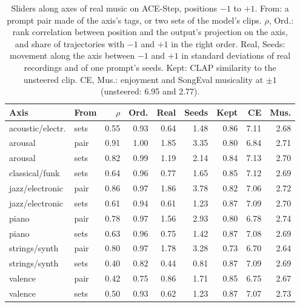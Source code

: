 \begin{table}[t]\centering\footnotesize\setlength{\tabcolsep}{2.5pt}
\begin{tabular}{llrrrrrrr}
\toprule
Axis & From & $\rho$ & Ord. & Real & Seeds & Kept & CE & Mus. \\
\midrule
acoustic/electr. & sets & 0.55 & 0.93 & 0.64 & 1.48 & 0.86 & 7.11 & 2.68 \\
arousal & pair & 0.91 & 1.00 & 1.85 & 3.35 & 0.80 & 6.84 & 2.71 \\
arousal & sets & 0.82 & 0.99 & 1.19 & 2.14 & 0.84 & 7.13 & 2.70 \\
classical/funk & sets & 0.64 & 0.96 & 0.77 & 1.65 & 0.85 & 7.12 & 2.69 \\
jazz/electronic & pair & 0.86 & 0.97 & 1.86 & 3.78 & 0.82 & 7.06 & 2.72 \\
jazz/electronic & sets & 0.61 & 0.94 & 0.61 & 1.23 & 0.87 & 7.09 & 2.70 \\
piano & pair & 0.78 & 0.97 & 1.56 & 2.93 & 0.80 & 6.78 & 2.74 \\
piano & sets & 0.63 & 0.96 & 0.75 & 1.42 & 0.87 & 7.08 & 2.69 \\
strings/synth & pair & 0.80 & 0.97 & 1.78 & 3.28 & 0.73 & 6.70 & 2.64 \\
strings/synth & sets & 0.40 & 0.82 & 0.44 & 0.81 & 0.87 & 7.09 & 2.69 \\
valence & pair & 0.42 & 0.75 & 0.86 & 1.71 & 0.85 & 6.75 & 2.67 \\
valence & sets & 0.50 & 0.93 & 0.62 & 1.23 & 0.87 & 7.07 & 2.73 \\
\bottomrule
\end{tabular}
\caption{Sliders along axes of real music on ACE-Step, positions $-1$ to $+1$. From: a prompt pair made of the axis's tags, or two sets of the model's clips. $\rho$, Ord.: rank correlation between position and the output's projection on the axis, and share of trajectories with $-1$ and $+1$ in the right order. Real, Seeds: movement along the axis between $-1$ and $+1$ in standard deviations of real recordings and of one prompt's seeds. Kept: CLAP similarity to the unsteered clip. CE, Mus.: enjoyment and SongEval musicality at $\pm1$ (unsteered: 6.95 and 2.77).}\label{tab:axes}
\end{table}
